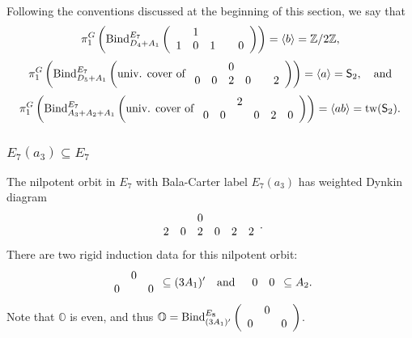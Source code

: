 \documentclass[11pt]{amsart}
\renewcommand{\O}{{\mathbb O}}
\newcommand{\bZ}{{\mathbb Z}}
\newcommand{\Sym}{{\mathsf{S}}}
\newcommand{\tw}{{{\mbox{\rm tw}}}}
\newcommand{\BInd}{{{\mbox{\rm Bind}}}}
\numberwithin{equation}{section}
\begin{document}
	Following the conventions discussed at the beginning of this section, we say that $$\pi_1^G\left(\BInd_{D_4 + A_1}^{E_7}\left(\begin{array}{c c c c c c}
		& 1 & & & \\
		1 & 0 & 1 &  & 0 \\
	\end{array}\right)\right)=\langle b\rangle=\bZ/2\bZ,$$
	$$
	\pi_1^G\left(\BInd_{D_5 + A_1}^{E_7}\left(\mbox{univ. cover of }\begin{array}{c c c c c c}
		& & 0 & & &\\
		0 & 0 & 2 & 0 & & 2   \\
	\end{array} \right)\right)=\langle a\rangle=\Sym_2,\quad \mbox{and}$$ 
	$$
	\pi_1^G\left(\BInd_{A_3+A_2+ A_1}^{E_7}\left(\mbox{univ. cover of }\begin{array}{c c c c c c c}
		& & 2 & & &\\
		0 & 0 &  & 0 & 2 & 0   \\
	\end{array} \right)\right)=\langle ab\rangle=\tw(\Sym_2).$$ 
	\fi
	
	\subsubsection{\texorpdfstring{$E_7(a_3)\subseteq E_7$}{E7a3 in E7}}\label{sss: E7a3 in E7}
	
	The nilpotent orbit in $E_7$ with Bala-Carter label $E_7(a_3)$ has weighted Dynkin diagram
	$$\begin{array}{c c c c c c}
		& & 0 & & & \\
		2 & 0 & 2 & 0 & 2 & 2 \\
	\end{array}.$$ There are two rigid induction data for this nilpotent orbit:
	$$\begin{array}{c c c}
		& 0 &\\
		0 &  & 0   \\
	\end{array}\subseteq (3 A_1)'\quad\mbox{and}\quad \begin{array}{c c}
		0 & 0 \\
	\end{array}\subseteq A_2.$$ 
	Note that $\O$ is even, and thus $\O=\BInd_{(3 A_1)'}^{E_8}\left(\begin{array}{c c c}
		& 0 &\\
		0 &  & 0   \\
	\end{array}\right)$.
	
\end{document}

